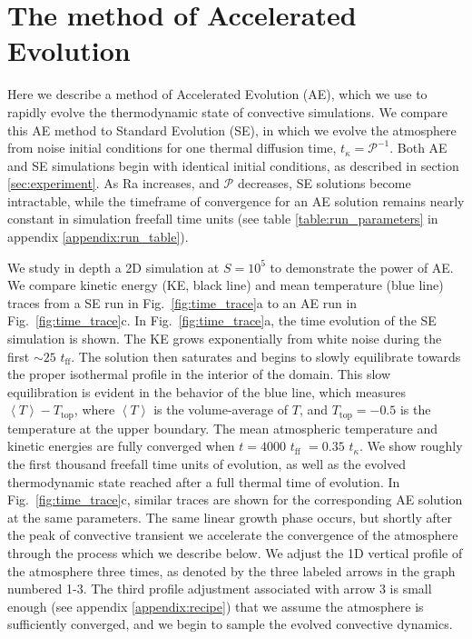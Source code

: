 \documentclass[aps, pre, onecolumn, nofootinbib, notitlepage, groupedaddress, amsfonts, amssymb, amsmath, longbibliography]{revtex4-1}
\newcommand{\angles}[1]{\ensuremath{\left\langle #1 \right\rangle}}
\begin{document}

\section{The method of Accelerated Evolution}
\label{sec:ae}
Here we describe a method of Accelerated Evolution (AE), which we use 
to rapidly evolve the thermodynamic state of convective simulations.  
We compare this AE method to Standard Evolution
(SE), in which we evolve the atmosphere from noise initial conditions
for one thermal diffusion time,
$t_\kappa = \mathcal{P}^{-1}$. Both AE and SE simulations begin with identical
initial conditions, as described in section \ref{sec:experiment}.
As Ra increases, and $\mathcal{P}$ decreases, SE solutions become intractable, 
while the timeframe of convergence for an AE solution remains nearly constant
in simulation freefall time units (see table \ref{table:run_parameters} in
appendix \ref{appendix:run_table}).

We study in depth a 2D simulation at $S = 10^5$ to demonstrate the power of AE.
We compare kinetic energy (KE, black line) and mean temperature (blue line)
traces from a SE run in Fig.~\ref{fig:time_trace}a to an AE run
in Fig.~\ref{fig:time_trace}c.
In Fig.~\ref{fig:time_trace}a, the time evolution of the SE simulation is shown.
The KE grows exponentially from white noise during the
first $\sim 25$ $t_{\text{ff}}$. The solution then saturates and begins to slowly
equilibrate towards the proper isothermal profile in the interior of the domain.
This slow equilibration is evident in the behavior of the blue line, which measures
$\angles{T} - T_{\text{top}}$, where \angles{T} is the volume-average of $T$, and
$T_{\text{top}} = -0.5$ is the temperature at the upper boundary.
The mean atmospheric temperature and
kinetic energies are fully converged when $t = 4000$ $t_{\text{ff}}$ $= 0.35$ $t_{\kappa}$.
We show roughly the first thousand freefall time
units of evolution, as well as the evolved thermodynamic state reached after a full
thermal time of evolution.  In Fig.~\ref{fig:time_trace}c, similar traces are
shown for the corresponding AE solution
at the same parameters. The same linear growth phase occurs, but shortly after
the peak of convective transient we accelerate the convergence of the atmosphere
through the process which we describe below. We adjust the 1D vertical profile of
the atmosphere three times, as denoted by the three labeled
arrows in the graph numbered 1-3.  The third profile adjustment associated with
arrow 3 is small enough (see appendix \ref{appendix:recipe}) that we assume
the atmosphere is sufficiently converged, and we begin to sample the evolved
convective dynamics.
\end{document}
